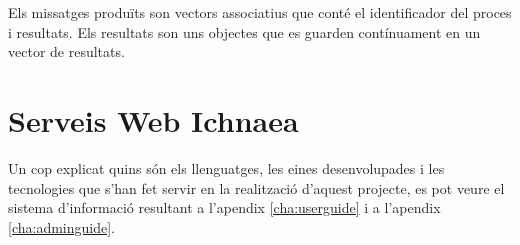 Els missatges produïts son vectors associatius que cont\'{e} el identificador del proces i resultats. Els resultats son uns objectes que es guarden contínuament en un vector de resultats.


\section{Serveis Web Ichnaea}
Un cop explicat quins són els llenguatges, les eines desenvolupades i les tecnologies que s’han fet servir en la realització d’aquest projecte, es pot veure el sistema d’informació resultant a l'apendix \ref{cha:userguide}
i a l'apendix \ref{cha:adminguide}.\\ 
 